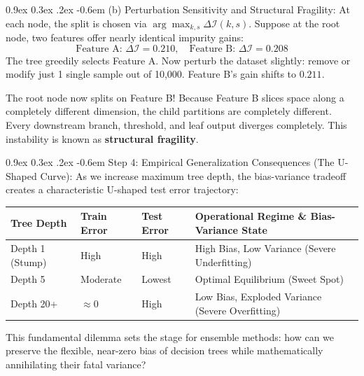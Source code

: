 \documentclass[11pt,a4paper]{article}
\makeatletter
\renewcommand\paragraph{\@startsection{paragraph}{4}{\z@}%
                                     {0.9ex \@plus0.3ex \@minus.2ex}%
                                     {-0.6em}%
                                     {\normalfont\normalsize\bfseries}}
\makeatother
\begin{document}
\paragraph{(b) Perturbation Sensitivity and Structural Fragility:}
At each node, the split is chosen via $\arg\max_{k, s} \Delta \mathcal{I}(k, s)$. Suppose at the root node, two features offer nearly identical impurity gains:
\begin{equation*}
    \text{Feature A: } \Delta \mathcal{I} = 0.210, \quad \text{Feature B: } \Delta \mathcal{I} = 0.208
\end{equation*}
The tree greedily selects Feature A. Now perturb the dataset slightly: remove or modify just 1 single sample out of 10,000. Feature B's gain shifts to $0.211$. 

The root node now splits on Feature B! Because Feature B slices space along a completely different dimension, the child partitions are completely different. Every downstream branch, threshold, and leaf output diverges completely. This instability is known as \textbf{structural fragility}.

\paragraph{Step 4: Empirical Generalization Consequences (The U-Shaped Curve):}
As we increase maximum tree depth, the bias-variance tradeoff creates a characteristic U-shaped test error trajectory:
\begin{table}[!htbp]
\centering
\small
\begin{tabular}{@{}llll@{}}
\toprule
\textbf{Tree Depth} & \textbf{Train Error} & \textbf{Test Error} & \textbf{Operational Regime \& Bias-Variance State} \\ \midrule
Depth 1 (Stump)     & High                 & High                & High Bias, Low Variance (Severe Underfitting) \\
Depth 5             & Moderate             & Lowest              & Optimal Equilibrium (Sweet Spot) \\
Depth 20+           & $\approx 0$          & High                & Low Bias, Exploded Variance (Severe Overfitting) \\ \bottomrule
\end{tabular}
\end{table}

This fundamental dilemma sets the stage for ensemble methods: how can we preserve the flexible, near-zero bias of decision trees while mathematically annihilating their fatal variance?
\end{document}
